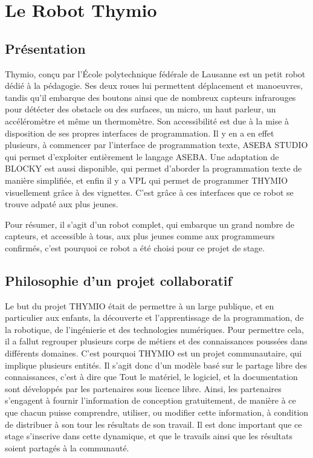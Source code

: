 \documentclass[a4paper, 12pt]{report}
\begin{document}

\chapter{Le Robot Thymio}
\section{Présentation \cite{thymio2016}}

Thymio, conçu par l’École polytechnique fédérale de Lausanne est un petit robot dédié à la pédagogie. Ses deux roues lui permettent déplacement et manoeuvres, tandis qu'il embarque des boutons ainsi que de nombreux capteurs infrarouges pour détécter des obstacle ou des surfaces, un micro, un haut parleur, un accéléromètre et même un thermomètre. Son accessibilité est due à la mise à disposition de ses propres interfaces de programmation. Il y en a en effet plusieurs, à commencer par l'interface de programmation texte, ASEBA STUDIO qui permet d'exploiter entièrement le langage ASEBA. Une adaptation de BLOCKY est aussi disponible, qui permet d'aborder la programmation texte de manière simplifiée, et enfin il y a VPL qui permet de programmer THYMIO visuellement grâce à des vignettes. C'est grâce à ces interfaces que ce robot se trouve adpaté aux plus jeunes.

Pour résumer, il s'agit d'un robot complet, qui embarque un grand nombre de capteurs, et accessible à tous, aux plus jeunes comme aux programmeurs confirmés, c'est pourquoi ce robot a été choisi pour ce projet de stage.

\section{Philosophie d'un projet collaboratif\cite{thymio2016}}
Le but du projet THYMIO était de permettre à un large publique, et en particulier aux enfants, la découverte et l'apprentissage de la programmation, de la robotique, de l'ingénierie et des technologies numériques. Pour permettre cela, il a fallut regrouper plusieurs corps de métiers et des connaissances poussées dans différents domaines. C'est pourquoi THYMIO est un projet communautaire, qui implique plusieurs entités. Il s'agit donc d'un modèle basé sur le partage libre des connaissances, c'est à dire que Tout le matériel, le logiciel, et la documentation sont développés par les partenaires sous licence libre. Ainsi, les partenaires s'engagent à fournir l'information de conception gratuitement, de manière à ce que chacun puisse comprendre, utiliser, ou modifier cette information, à condition de distribuer à son tour les résultats de son travail. Il est donc important que ce stage s'inscrive dans cette dynamique, et que le travails ainsi que les résultats soient partagés à la communauté.
\end{document}
